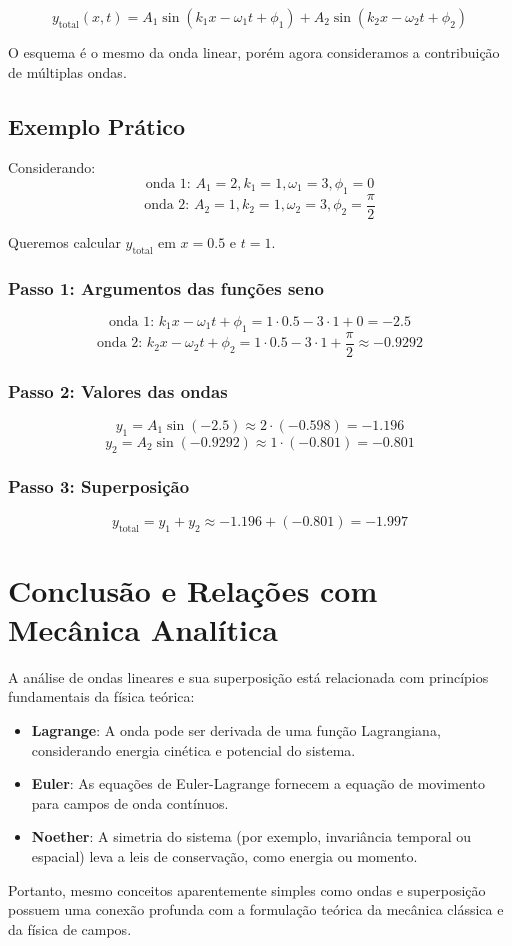 \documentclass[12pt,a4paper]{article}
\begin{document}
\begin{equation}
y_{\text{total}}(x,t) = A_1 \sin(k_1 x - \omega_1 t + \phi_1) + A_2 \sin(k_2 x - \omega_2 t + \phi_2)
\end{equation}

O esquema é o mesmo da onda linear, porém agora consideramos a contribuição de múltiplas ondas.

\subsection*{Exemplo Prático}
Considerando:
\[
\text{onda 1: } A_1 = 2, k_1 = 1, \omega_1 = 3, \phi_1 = 0
\]
\[
\text{onda 2: } A_2 = 1, k_2 = 1, \omega_2 = 3, \phi_2 = \frac{\pi}{2}
\]

Queremos calcular $y_{\text{total}}$ em $x=0.5$ e $t=1$.

\subsubsection*{Passo 1: Argumentos das funções seno}
\[
\text{onda 1: } k_1 x - \omega_1 t + \phi_1 = 1 \cdot 0.5 - 3 \cdot 1 + 0 = -2.5
\]
\[
\text{onda 2: } k_2 x - \omega_2 t + \phi_2 = 1 \cdot 0.5 - 3 \cdot 1 + \frac{\pi}{2} \approx -0.9292
\]

\subsubsection*{Passo 2: Valores das ondas}
\[
y_1 = A_1 \sin(-2.5) \approx 2 \cdot (-0.598) = -1.196
\]
\[
y_2 = A_2 \sin(-0.9292) \approx 1 \cdot (-0.801) = -0.801
\]

\subsubsection*{Passo 3: Superposição}
\[
y_{\text{total}} = y_1 + y_2 \approx -1.196 + (-0.801) = -1.997
\]

\section{Conclusão e Relações com Mecânica Analítica}
A análise de ondas lineares e sua superposição está relacionada com princípios fundamentais da física teórica:

\begin{itemize}
    \item \textbf{Lagrange}: A onda pode ser derivada de uma função Lagrangiana, considerando energia cinética e potencial do sistema.
    \item \textbf{Euler}: As equações de Euler-Lagrange fornecem a equação de movimento para campos de onda contínuos.
    \item \textbf{Noether}: A simetria do sistema (por exemplo, invariância temporal ou espacial) leva a leis de conservação, como energia ou momento.
\end{itemize}

Portanto, mesmo conceitos aparentemente simples como ondas e superposição possuem uma conexão profunda com a formulação teórica da mecânica clássica e da física de campos.
\end{document}
